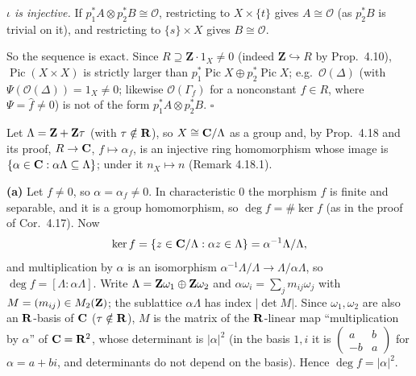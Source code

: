 \documentclass[11pt]{article}
\begin{document}
\emph{$\iota$ is injective.} If $p_1^*A\otimes p_2^*B\cong\mathcal O$, restricting to $X\times\{t\}$ gives $A\cong\mathcal O$ (as $p_2^*B$ is trivial on it), and restricting to $\{s\}\times X$ gives $B\cong\mathcal O$.

So the sequence is exact. Since $R\supseteq\mathbf Z\cdot1_X\ne0$ (indeed $\mathbf Z\hookrightarrow R$ by Prop.~4.10), $\operatorname{Pic}(X\times X)$ is strictly larger than $p_1^*\operatorname{Pic}X\oplus p_2^*\operatorname{Pic}X$; e.g.\ $\mathcal O(\Delta)$ (with $\Psi(\mathcal O(\Delta))=1_X\ne0$; likewise $\mathcal O(\Gamma_f)$ for a nonconstant $f\in R$, where $\Psi=\hat f\ne0$) is not of the form $p_1^*A\otimes p_2^*B$. \hfill$\square$

\pf
Let $\Lambda=\mathbf Z+\mathbf Z\tau$ (with $\tau\notin\mathbf R$), so $X\cong\mathbf C/\Lambda$ as a group and, by Prop.~4.18 and its proof, $R\to\mathbf C$, $f\mapsto\alpha_f$, is an injective ring homomorphism whose image is $\{\alpha\in\mathbf C:\alpha\Lambda\subseteq\Lambda\}$; under it $n_X\mapsto n$ (Remark 4.18.1).

\textbf{(a)} Let $f\neq0$, so $\alpha=\alpha_f\neq0$. In characteristic $0$ the morphism $f$ is finite and separable, and it is a group homomorphism, so $\deg f=\#\ker f$ (as in the proof of Cor.~4.17). Now
\[
\ker f=\{z\in\mathbf C/\Lambda:\alpha z\in\Lambda\}=\alpha^{-1}\Lambda/\Lambda,
\]
and multiplication by $\alpha$ is an isomorphism $\alpha^{-1}\Lambda/\Lambda\to\Lambda/\alpha\Lambda$, so $\deg f=[\Lambda:\alpha\Lambda]$. Write $\Lambda=\mathbf Z\omega_1\oplus\mathbf Z\omega_2$ and $\alpha\omega_i=\sum_jm_{ij}\omega_j$ with $M=(m_{ij})\in M_2(\mathbf Z)$; the sublattice $\alpha\Lambda$ has index $|\det M|$. Since $\omega_1,\omega_2$ are also an $\mathbf R$-basis of $\mathbf C$ ($\tau\notin\mathbf R$), $M$ is the matrix of the $\mathbf R$-linear map ``multiplication by $\alpha$'' of $\mathbf C=\mathbf R^2$, whose determinant is $|\alpha|^2$ (in the basis $1,i$ it is $\begin{pmatrix}a&b\\-b&a\end{pmatrix}$ for $\alpha=a+bi$, and determinants do not depend on the basis). Hence $\deg f=|\alpha|^2$.
\end{document}
